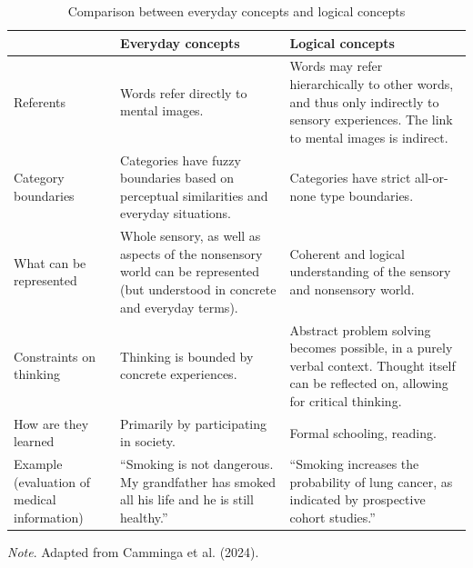 \documentclass[authordate, reflection, issue]{jote-new-article}
\begin{document}
	\begin{table}
		\begin{fullwidth}
			\begin{threeparttable}
				\caption{Comparison between everyday concepts and logical concepts}
				\begin{tabularx}{\linewidth}{@{} >{\RaggedRight\arraybackslash}p{11.5em} >{\RaggedRight\arraybackslash}X >{\RaggedRight\arraybackslash}X @{}}
					\toprule   & Everyday concepts & Logical concepts \\

					\midrule Referents & Words refer directly to mental images.  &
					Words may refer hierarchically to other words, and thus only indirectly to sensory experiences. The link to mental images is indirect.
					\\

					Category boundaries &
					Categories have fuzzy boundaries based on perceptual similarities and everyday situations.
					& Categories have strict all-or-none type boundaries. \\

					What can be represented &
					Whole sensory, as well as aspects of the nonsensory world can be represented (but understood in concrete and everyday terms).
					& Coherent and logical understanding of the sensory and nonsensory world.
					\\

					Constraints on thinking & Thinking is bounded by concrete experiences. &
					Abstract problem solving becomes possible, in a purely verbal context. Thought itself can be reflected on, allowing for critical thinking.
					\\

					How are they learned & Primarily by participating in society. &
					Formal schooling, reading. \\

					\midrule Example (evaluation of medical information) & “Smoking is not dangerous. My grandfather has smoked all his life and he is still healthy.”
					& “Smoking increases the probability of lung cancer, as indicated by prospective cohort studies.”
					\\
					\bottomrule


				\end{tabularx}
				\vspace{3pt}
				\emph{Note}. Adapted from Camminga et al. (2024).
			\end{threeparttable}
		\end{fullwidth}
	\end{table}
\end{document}
